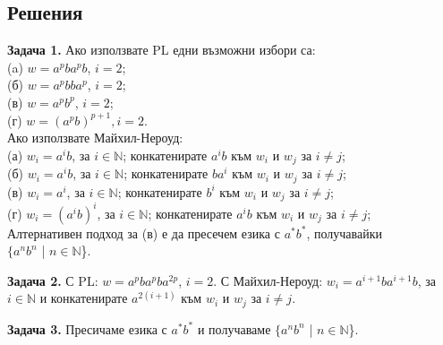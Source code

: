 \documentclass[openany]{book}
\begin{document}
\subsection{Решения}
    \textbf{Задача 1.} Ако използвате PL едни възможни избори са: \\
    (a) $w = a^pba^pb$, $i = 2$; \\
    (б) $w = a^pbba^p$, $i = 2$; \\
    (в) $w = a^pb^p$, $i = 2$; \\
    (г) $w = (a^pb)^{p+1}, i = 2$. \\
    Ако използвате Майхил-Нероуд: \\
    (а) $w_i = a^ib$, за $i \in \mathbb{N}$; конкатенирате $a^ib$ към $w_i$ и $w_j$ за $i \neq j$; \\
    (б) $w_i = a^ib$, за $i \in \mathbb{N}$; конкатенирате $ba^i$ към $w_i$ и $w_j$ за $i \neq j$; \\
    (в) $w_i = a^i$, за $i \in \mathbb{N}$; конкатенирате $b^i$ към $w_i$ и $w_j$ за $i \neq j$; \\
    (г) $w_i = (a^ib)^{i}$, за $i \in \mathbb{N}$; конкатенирате $a^ib$ към $w_i$ и $w_j$ за $i \neq j$; \\
    \vspace{5pt}
    Алтернативен подход за (в) е да пресечем езика с $a^*b^*$, получавайки \\ $\{a^nb^n$ | $n \in \mathbb{N}$\}.

    \vspace{15pt}

    \textbf{Задача 2.} С PL: $w = a^pba^pba^{2p}$, $i = 2$. С Майхил-Нероуд: $w_i = a^{i+1}ba^{i+1}b$,
    за $i \in \mathbb{N}$ и конкатенирате $a^{2(i+1)}$ към $w_i$ и $w_j$ за $i \neq j$.

    \vspace{15pt}

    \textbf{Задача 3.} Пресичаме езика с $a^*b^*$ и получаваме $\{a^nb^n$ | $n \in \mathbb{N}$\}.

    \vspace{15pt}
\end{document}
